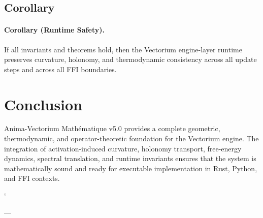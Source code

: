 \subsection{Corollary}

\paragraph{Corollary (Runtime Safety).}
If all invariants and theorems hold, then the Vectorium engine-layer runtime
preserves curvature, holonomy, and thermodynamic consistency across all update
steps and across all FFI boundaries.

\section{Conclusion}

Anima-Vectorium Mathématique v5.0 provides a complete geometric, thermodynamic,
and operator-theoretic foundation for the Vectorium engine. The integration of
activation-induced curvature, holonomy transport, free-energy dynamics, spectral
translation, and runtime invariants ensures that the system is mathematically
sound and ready for executable implementation in Rust, Python, and FFI contexts.


`

---

